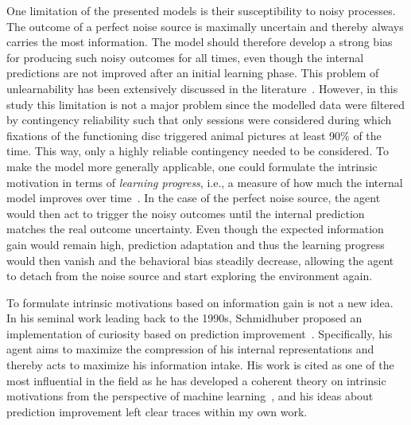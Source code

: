 \documentclass[a4paper]{scrreprt}
\begin{document}
One limitation of the presented models is their susceptibility to noisy processes. The outcome of a perfect noise source is maximally uncertain and thereby always carries the most information. The model should therefore develop a strong bias for producing such noisy outcomes for all times, even though the internal predictions are not improved after an initial learning phase. This problem of unlearnability has been extensively discussed in the literature~\cite{schmidhuber91b,mirolli13}. However, in this study this limitation is not a major problem since the modelled data were filtered by contingency reliability such that only sessions were considered during which fixations of the functioning disc triggered animal pictures at least 90\% of the time. This way, only a highly reliable contingency needed to be considered. To make the model more generally applicable, one could formulate the intrinsic motivation in terms of \textit{learning progress}, i.e., a measure of how much the internal model improves over time~\cite{schmidhuber91, oudeyer07}. In the case of the perfect noise source, the agent would then act to trigger the noisy outcomes until the internal prediction matches the real outcome uncertainty. Even though the expected information gain would remain high, prediction adaptation and thus the learning progress would then vanish and the behavioral bias steadily decrease, allowing the agent to detach from the noise source and start exploring the environment again.

To formulate intrinsic motivations based on information gain is not a new idea. In his seminal work leading back to the 1990s, Schmidhuber proposed an implementation of curiosity based on prediction improvement~\cite{schmidhuber91,schmidhuber91b}. Specifically, his agent aims to maximize the compression of his internal representations and thereby acts to maximize his information intake. His work is cited as one of the most influential in the field as he has developed a coherent theory on intrinsic motivations from the perspective of machine learning~\cite{schmidhuber10}, and his ideas about prediction improvement left clear traces within my own work.
\end{document}
